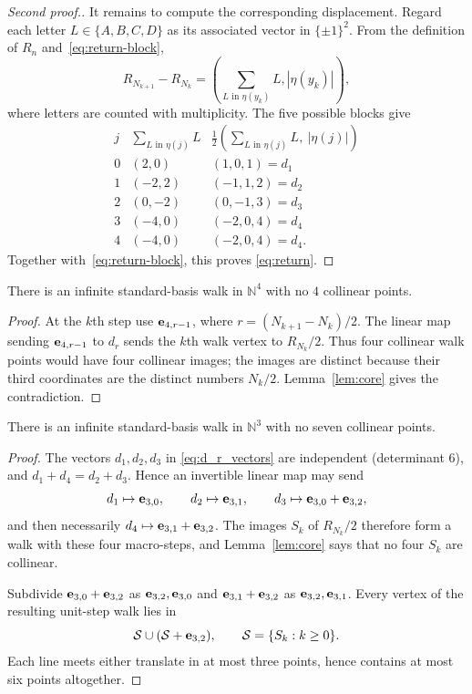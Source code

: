 \documentclass[12pt,reqno]{article}
\newcommand{\N}{\mathbb N}
\begin{document}
\begin{proof}[Second proof.]
It remains to compute the corresponding displacement.  Regard each letter
$L\in\{A,B,C,D\}$ as its associated vector in $\{\pm1\}^2$.  From the
definition of $R_n$ and~\eqref{eq:return-block},
\[
 R_{N_{k+1}}-R_{N_k}
 =\left(
    \sum_{L\text{ in }\eta(y_k)}L,
    |\eta(y_k)|
  \right),
\]
where letters are counted with multiplicity.  The five possible blocks give
\begin{equation}\label{eq:displacements}
\begin{array}{c|c|c}
 j&\displaystyle\sum_{L\text{ in }\eta(j)}L
  &\displaystyle\frac12\left(
       \sum_{L\text{ in }\eta(j)}L,\ |\eta(j)|
     \right)\\ \hline
 0&(2,0)&(1,0,1)=d_1\\
 1&(-2,2)&(-1,1,2)=d_2\\
 2&(0,-2)&(0,-1,3)=d_3\\
 3&(-4,0)&(-2,0,4)=d_4\\
 4&(-4,0)&(-2,0,4)=d_4.
\end{array}
\end{equation}
Together with~\eqref{eq:return-block}, this proves
\eqref{eq:return}.
\end{proof}

\begin{theorem}
There is an infinite standard-basis walk in $\N^4$ with no $4$ collinear
points.
\label{thm:d4}
\end{theorem}

\begin{proof}
At the $k$th step use ${\bf e}_{4,r-1}$, where $r=(N_{k+1}-N_k)/2$.  The linear map
sending ${\bf e}_{4,r-1}$ to $d_r$ sends the $k$th walk vertex to $R_{N_k}/2$.
Thus four collinear walk points would have four collinear images; the
images are distinct because their third coordinates are the distinct
numbers $N_k/2$.  Lemma~\ref{lem:core} gives the contradiction.
\end{proof}

\begin{theorem}\label{thm:d3}
There is an infinite standard-basis walk in $\N^3$ with no seven collinear
points.
\end{theorem}
\begin{proof}
The vectors $d_1,d_2,d_3$ in \eqref{eq:d_r_vectors} are independent
(determinant $6$), and $d_1+d_4=d_2+d_3$. Hence an invertible linear map
may send
\[
 d_1\mapsto {\bf e}_{3,0},\qquad d_2\mapsto {\bf e}_{3,1},\qquad
 d_3\mapsto {\bf e}_{3,0}+{\bf e}_{3,2},
\]
and then necessarily $d_4\mapsto {\bf e}_{3,1}+{\bf e}_{3,2}$.  The images
$S_k$ of $R_{N_k}/2$ therefore form a walk with these four macro-steps,
and Lemma~\ref{lem:core} says that no four $S_k$ are collinear.

Subdivide ${\bf e}_{3,0}+{\bf e}_{3,2}$ as ${\bf e}_{3,2},{\bf e}_{3,0}$ and ${\bf e}_{3,1}+{\bf e}_{3,2}$ as ${\bf e}_{3,2},{\bf e}_{3,1}$.  Every
vertex of the resulting unit-step walk lies in
\[
 \mathcal S\cup(\mathcal S+{\bf e}_{3,2}),\qquad \mathcal S=\{S_k:k\ge0\}.
\]
Each line meets either translate in at most three points, hence contains
at most six points altogether.
\end{proof}
\end{document}
